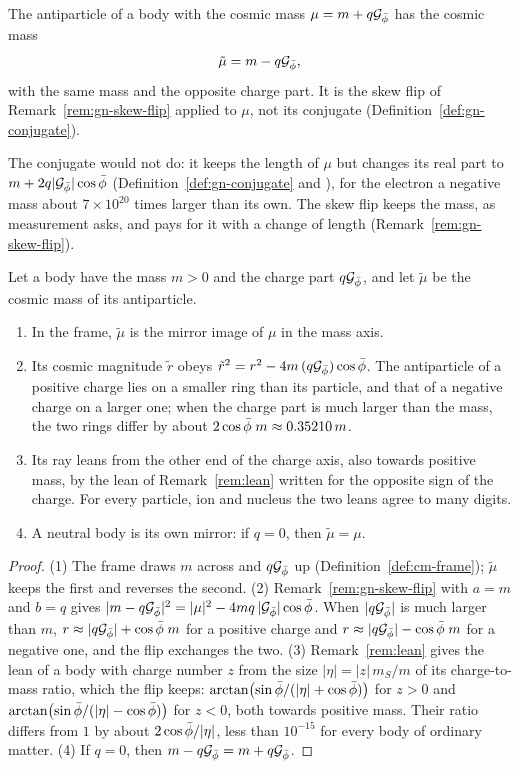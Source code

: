 \begin{definition}\label{def:fa-anti}
The antiparticle of a body with the cosmic mass $\mu = m + q\mathcal{G}_{\bar{\phi}}$ has the cosmic mass
\[
\tilde{\mu} = m - q\mathcal{G}_{\bar{\phi}} ,
\]
with the same mass and the opposite charge part. It is the skew flip of Remark~\ref{rem:gn-skew-flip} applied to $\mu$, not its conjugate (Definition~\ref{def:gn-conjugate}).
\end{definition}

The conjugate would not do: it keeps the length of $\mu$ but changes its real part to $m + 2q|\mathcal{G}_{\bar{\phi}}|\cos\bar{\phi}$ (Definition~\ref{def:gn-conjugate} and ), for the electron a negative mass about $7 \times 10^{20}$ times larger than its own. The skew flip keeps the mass, as measurement asks, and pays for it with a change of length (Remark~\ref{rem:gn-skew-flip}).

\begin{proposition}\label{prop:fa-mirror}
Let a body have the mass $m > 0$ and the charge part $q\mathcal{G}_{\bar{\phi}}$, and let $\tilde{\mu}$ be the cosmic mass of its antiparticle.
\begin{enumerate}
  \item In the frame, $\tilde{\mu}$ is the mirror image of $\mu$ in the mass axis.
  \item Its cosmic magnitude $\tilde{r}$ obeys $\tilde{r}^2 = r^2 - 4m\,(q\mathcal{G}_{\bar{\phi}})\cos\bar{\phi}$. The antiparticle of a positive charge lies on a smaller ring than its particle, and that of a negative charge on a larger one; when the charge part is much larger than the mass, the two rings differ by about $2\cos\bar{\phi}\;m \approx 0.35210\,m$.
  \item Its ray leans from the other end of the charge axis, also towards positive mass, by the lean of Remark~\ref{rem:lean} written for the opposite sign of the charge. For every particle, ion and nucleus the two leans agree to many digits.
  \item A neutral body is its own mirror: if $q = 0$, then $\tilde{\mu} = \mu$.
\end{enumerate}
\end{proposition}

\begin{proof}
(1) The frame draws $m$ across and $q\mathcal{G}_{\bar{\phi}}$ up (Definition~\ref{def:cm-frame}); $\tilde{\mu}$ keeps the first and reverses the second. (2) Remark~\ref{rem:gn-skew-flip} with $a = m$ and $b = q$ gives $|m - q\mathcal{G}_{\bar{\phi}}|^2 = |\mu|^2 - 4mq\,|\mathcal{G}_{\bar{\phi}}|\cos\bar{\phi}$. When $|q\mathcal{G}_{\bar{\phi}}|$ is much larger than $m$, $r \approx |q\mathcal{G}_{\bar{\phi}}| + \cos\bar{\phi}\;m$ for a positive charge and $r \approx |q\mathcal{G}_{\bar{\phi}}| - \cos\bar{\phi}\;m$ for a negative one, and the flip exchanges the two. (3) Remark~\ref{rem:lean} gives the lean of a body with charge number $z$ from the size $|\eta| = |z|\,m_S/m$ of its charge-to-mass ratio, which the flip keeps: $\arctan\bigl(\sin\bar{\phi}/(|\eta| + \cos\bar{\phi})\bigr)$ for $z > 0$ and $\arctan\bigl(\sin\bar{\phi}/(|\eta| - \cos\bar{\phi})\bigr)$ for $z < 0$, both towards positive mass. Their ratio differs from $1$ by about $2\cos\bar{\phi}/|\eta|$, less than $10^{-15}$ for every body of ordinary matter. (4) If $q = 0$, then $m - q\mathcal{G}_{\bar{\phi}} = m + q\mathcal{G}_{\bar{\phi}}$.
\end{proof}

